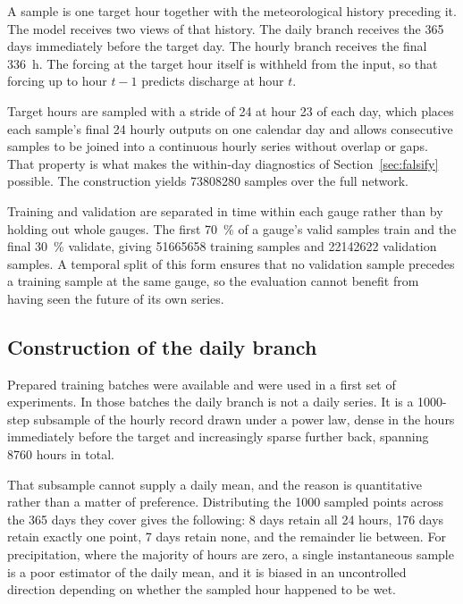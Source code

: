 A sample is one target hour together with the meteorological history preceding it. The
model receives two views of that history. The daily branch receives the \num{365} days
immediately before the target day. The hourly branch receives the final \SI{336}{\hour}. The
forcing at the target hour itself is withheld from the input, so that forcing up to hour
$t-1$ predicts discharge at hour $t$.

Target hours are sampled with a stride of \num{24} at hour 23 of each day, which places each
sample's final \num{24} hourly outputs on one calendar day and allows consecutive samples to
be joined into a continuous hourly series without overlap or gaps. That property is what
makes the within-day diagnostics of Section~\ref{sec:falsify} possible. The construction
yields \num{73808280} samples over the full network.

Training and validation are separated in time within each gauge rather than by holding out
whole gauges. The first \SI{70}{\percent} of a gauge's valid samples train and the final
\SI{30}{\percent} validate, giving \num{51665658} training samples and \num{22142622}
validation samples. A temporal split of this form ensures that no validation sample precedes
a training sample at the same gauge, so the evaluation cannot benefit from having seen the
future of its own series.

\subsection{Construction of the daily branch}

Prepared training batches were available and were used in a first set of experiments. In
those batches the daily branch is not a daily series. It is a \num{1000}-step subsample of
the hourly record drawn under a power law, dense in the hours immediately before the target
and increasingly sparse further back, spanning \num{8760} hours in total.

That subsample cannot supply a daily mean, and the reason is quantitative rather than a
matter of preference. Distributing the \num{1000} sampled points across the \num{365} days
they cover gives the following: \num{8} days retain all \num{24} hours, \num{176} days retain
exactly one point, \num{7} days retain none, and the remainder lie between. For
precipitation, where the majority of hours are zero, a single instantaneous sample is a poor
estimator of the daily mean, and it is biased in an uncontrolled direction depending on
whether the sampled hour happened to be wet.

